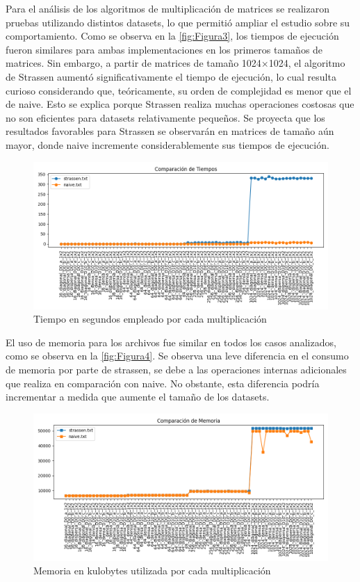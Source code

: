 \newpage
Para el análisis de los algoritmos de multiplicación de matrices se realizaron pruebas utilizando distintos datasets, lo que permitió ampliar el estudio sobre su comportamiento. Como se observa en la \autoref{fig:Figura3}, los tiempos de ejecución fueron similares para ambas implementaciones en los primeros tamaños de matrices. Sin embargo, a partir de matrices de tamaño 1024×1024, el algoritmo de Strassen aumentó significativamente el tiempo de ejecución, lo cual resulta curioso considerando que, teóricamente, su orden de complejidad es menor que el de naive. Esto se explica porque Strassen realiza muchas operaciones costosas que no son eficientes para datasets relativamente pequeños. Se proyecta que los resultados favorables para Strassen se observarán en matrices de tamaño aún mayor, donde naive incremente considerablemente sus tiempos de ejecución.\\

\begin{figure}[H]
    \centering
    \includegraphics[width=\textwidth]{../code/matrix_multiplication/data/plots/Grafico_tiempos.png}
    \caption{Tiempo en segundos empleado por cada multiplicación}
    \label{fig:Figura3}
\end{figure}

\newpage
El uso de memoria para los archivos fue similar en todos los casos analizados, como se observa en la \autoref{fig:Figura4}. Se observa una leve diferencia en el consumo de memoria por parte de strassen, se debe a las operaciones internas adicionales que realiza en comparación con naive. No obstante, esta diferencia podría incrementar a medida que aumente el tamaño de los datasets.\\

\begin{figure}[H]
    \includegraphics[width=\textwidth]{../code/matrix_multiplication/data/plots/Grafico_memoria.png}
    \caption{Memoria en kulobytes utilizada por cada multiplicación}
    \label{fig:Figura4}
\end{figure}